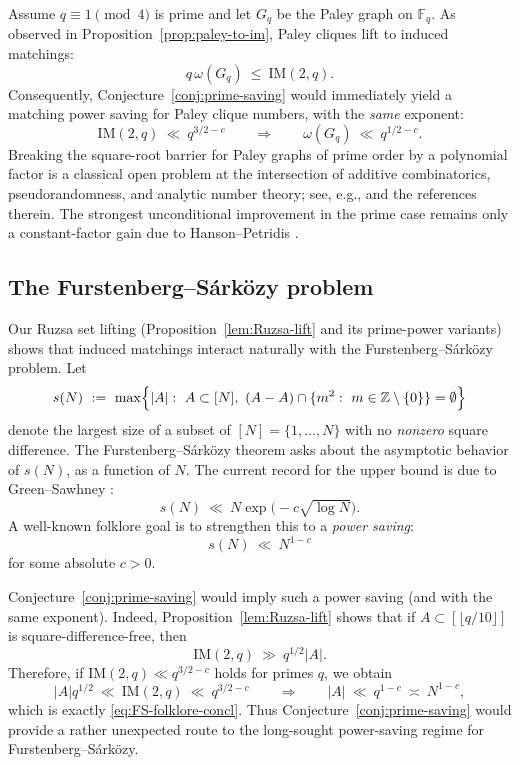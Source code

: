 \documentclass[12pt,reqno]{amsart}
\theoremstyle{plain}
\theoremstyle{definition}
\newcommand{\F}{\mathbb{F}}
\newcommand{\Z}{\mathbb{Z}}
\newcommand{\IM}{\mathrm{IM}}
\newcommand{\1}{\mathbf{1}}
\begin{document}
Assume $q\equiv 1\pmod 4$ is prime and let $G_q$ be the Paley graph on $\F_q$.
As observed in Proposition~\ref{prop:paley-to-im}, Paley cliques lift to induced matchings:
\begin{equation}\label{eq:paley-im-ineq-concl}
  q\,\omega(G_q)\ \le\ \IM(2,q).
\end{equation}
Consequently, Conjecture~\ref{conj:prime-saving} would immediately yield a matching power saving for Paley clique numbers,
with the \emph{same} exponent:
\[
  \IM(2,q)\ \ll\ q^{3/2-c}
  \qquad\Longrightarrow\qquad
  \omega(G_q)\ \ll\ q^{1/2-c}.
\]
Breaking the square-root barrier for Paley graphs of prime order by a polynomial factor is a classical open problem
at the intersection of additive combinatorics, pseudorandomness, and analytic number theory; see, e.g.,
\cite{Yip2022PrimePowerPaley,kunisky2023} and the references therein.
The strongest unconditional improvement in the prime case remains only a constant-factor gain due to Hanson--Petridis \cite{HansonPetridis2021}.

\subsection*{The Furstenberg--S\'ark\"ozy problem}

Our Ruzsa set lifting (Proposition~\ref{lem:Ruzsa-lift} and its prime-power variants) shows that induced matchings
interact naturally with the Furstenberg--S\'ark\"ozy problem.
Let
\[
  s(N)\ :=\ \max\Bigl\{|A|:\ A\subset [N],\ (A-A)\cap\{m^2:\ m\in\Z\setminus\{0\}\}=\emptyset\Bigr\}
\]
denote the largest size of a subset of $[N]=\{1,\dots,N\}$ with no \emph{nonzero} square difference.
The Furstenberg--S\'ark\"ozy theorem asks about the asymptotic behavior of $s(N)$, as a function of $N$.
The current record for the upper bound is due to Green--Sawhney \cite{GreenSawhney}:
\begin{equation}\label{eq:GS-record-concl}
  s(N)\ \ll\ N\exp\!\bigl(-c\sqrt{\log N}\bigr).
\end{equation}
A well-known folklore goal is to strengthen this to a \emph{power saving}:
\begin{equation}\label{eq:FS-folklore-concl}
  s(N)\ \ll\ N^{1-c}
\end{equation}
for some absolute $c>0$.

Conjecture~\ref{conj:prime-saving} would imply such a power saving (and with the same exponent).
Indeed, Proposition~\ref{lem:Ruzsa-lift} shows that if $A\subset [\lfloor q/10\rfloor]$ is square-difference-free, then
\[
  \IM(2,q)\ \gg\ q^{1/2}|A|.
\]
Therefore, if $\IM(2,q)\ll q^{3/2-c}$ holds for primes $q$, we obtain
\[
  |A|q^{1/2}\ \ll\ \IM(2,q)\ \ll\ q^{3/2-c}
  \qquad\Longrightarrow\qquad
  |A|\ \ll\ q^{1-c}\ \asymp\ N^{1-c},
\]
which is exactly \eqref{eq:FS-folklore-concl}.
Thus Conjecture~\ref{conj:prime-saving} would provide a rather unexpected route to the long-sought power-saving regime
for Furstenberg--S\'ark\"ozy.
\end{document}
